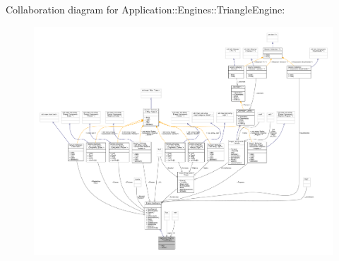 Collaboration diagram for Application\+:\+:Engines\+:\+:Triangle\+Engine\+:
\nopagebreak
\begin{figure}[H]
\begin{center}
\leavevmode
\includegraphics[width=350pt]{classApplication_1_1Engines_1_1TriangleEngine__coll__graph}
\end{center}
\end{figure}
